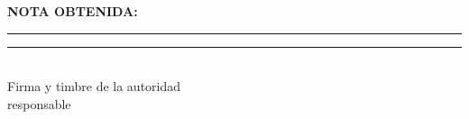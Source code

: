 
\chapter*{}  %
\thispagestyle{fancy}

\vspace*{2cm}

\begin{flushright}
    {\large\textbf{NOTA OBTENIDA:}}
    
    \vspace{2cm}
    
    \rule{4cm}{0.4pt}
    
    \vspace{3cm}
    
    \rule{6cm}{0.4pt}\\
    Firma y timbre de la autoridad\\
    responsable
\end{flushright}

\vfill

\newpage

